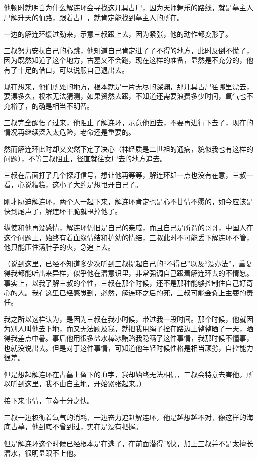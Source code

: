 他顿时就明白为什么解连环会寻找这几具古尸，因为天师舞乐的路线，就是墓主人尸解升天的仙路，跟着古尸，就肯定能找到墓主人的所在。

一边的解连环缓过劲来，示意三叔跟上去，因为紧张，他的动作都变形了。

三叔努力安抚自己的心跳，他知道自己肯定进了了不得的地方，此时反倒不慌了，因为既然知道了这个地方，古墓又不会跑，现在这样的准备，显然是不充分的，他有了十足的借口，可以说服自己退出去。

现在想来，他们所处的地方，根本就是一片无尽的深渊，那几具古尸往哪里漂去，要漂多久，根本无法猜测，如果贸然去跟，不知道还需要浪费多少时间，氧气也不充裕了，的确是相当不明智。

三叔完全醒悟了过来，他阻止了解连环，示意他回去，不要再进行下去了，现在的情况再继续深入太危险，老命还是重要的。

然而解连环此时却又突然下定了决心（神经质是二世祖的通病，貌似我也有这样的问题），不等三叔阻止，径直就往女尸去的地方追去。

三叔在后面打了几个探灯信号，想让他再等等，解连环却一点也没有在意，三叔一看，心说糟糕，这小子大约是想甩开自己了。

刚才胁迫解连环，两个人一起下来，解连环肯定也是心不甘情不愿的，如今应该是快到尾声了，解连环干脆就甩掉他了。

纵使和他再没感情，解连环仍旧是自己的亲戚，而且自己是所谓的哥哥，中国人在这个问题上，始终有着血缘情结和护幼的情结，三叔此时不可能丢下解连环不管，他只能压住满肚子的火，急追上去。

（说到这里，已经不知道多少次听到三叔提起自己的“不得已”以及“没办法”，重复得我都能听出来异样，似乎他在潜意识里，非常强调自己跟着解连环去的不情愿。事实上，以我了解三叔的个性，三叔在那个时候，还不是那种能够控制住自己好奇心的人。我在这里已经感觉到，必然，解连环之后的死，三叔可能会负上主要的责任。

我之所以这样认为，是因为三叔在我小时候，带过我一段时间。那个时候，他就因为别人叫他去下地，而又无法顾及我，就把我用绳子拴在路边上整整晒了一天，晒得我差点中暑。事后他用很多盐水棒冰贿赂我隐瞒了这件事情，我那时候不懂事，也就没说出去。但是对于这件事情，可知道他年轻时候性格是相当顽劣，自控能力很差。

但是想起解连环在古墓上留下的血字，我却始终无法相信，三叔会特意去害他。所以听到这里，我不由自主地，开始紧张起来。）

接下来事情，节奏十分之快。

三叔一边权衡着氧气的消耗，一边奋力追赶解连环，他是越想越不对，像这样的海底古墓，他到底不曾到过，实在是没有把握。

但是解连环这个时候已经根本是在逃了，在前面潜得飞快，加上三叔并不是太擅长潜水，很明显跟不上他。

